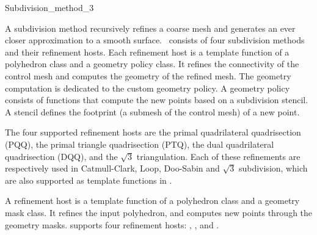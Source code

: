 
\ccRefPageBegin



\begin{ccRefClass}{Subdivision_method_3}

\ccDefinition

A subdivision method recursively refines a coarse mesh and 
generates an ever closer approximation to a smooth surface.
\ccClassTemplateName\ consists of four subdivision methods
and their refinement hosts. Each refinement host is a template 
function of a polyhedron class and a 
geometry policy class. It refines the connectivity of the
control mesh and computes the geometry of the refined mesh.
The geometry computation is dedicated to the custom
geometry policy. A geometry policy consists of functions 
that compute the new points based on a subdivision stencil.
A stencil defines the footprint (a submesh of the control mesh)
of a new point.

The four supported refinement hosts are the 
primal quadrilateral quadrisection (PQQ),
the primal triangle quadrisection (PTQ), 
the dual quadrilateral quadrisection (DQQ), 
and the $\sqrt{3}$ triangulation.
Each of these refinements are respectively used in 
Catmull-Clark, Loop, Doo-Sabin and $\sqrt{3}$ subdivision, which
are also supported as template functions in \ccClassTemplateName .


A refinement host is a template function of 
a polyhedron class and a geometry mask class. It refines
the input polyhedron, and computes new points through 
the geometry masks.
 supports four refinement hosts:
, ,  and .


\end{ccRefClass}
